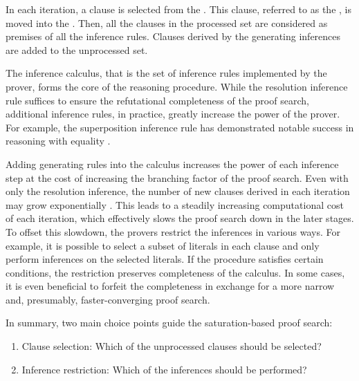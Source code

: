 In each iteration, a clause is selected from the .
This clause, referred to as the , is moved into the .
Then, all the clauses in the processed set are considered as premises of all the inference rules.
Clauses derived by the generating inferences are added to the unprocessed set.

The inference calculus, that is the set of inference rules implemented by the prover, forms the core of the reasoning procedure.
While the resolution inference rule suffices to ensure the refutational completeness of the proof search,
additional inference rules, in practice, greatly increase the power of the prover.
For example, the superposition inference rule has demonstrated notable success in reasoning with equality \cite{}.

Adding generating rules into the calculus increases the power of each inference step at the cost of increasing the branching factor of the proof search.
Even with only the resolution inference, the number of new clauses derived in each iteration may grow exponentially \cite{}.
This leads to a steadily increasing computational cost of each iteration,
which effectively slows the proof search down in the later stages.
To offset this slowdown, the provers restrict the inferences in various ways.
For example, it is possible to select a subset of literals in each clause and only perform inferences on the selected literals.
If the  procedure satisfies certain conditions,
the restriction preserves completeness of the calculus.
In some cases, it is even beneficial to forfeit the completeness in exchange for a more narrow and, presumably, faster-converging proof search.

In summary, two main choice points guide the \gls{saturation}-based proof search:
\begin{enumerate}
\item Clause selection: Which of the unprocessed clauses should be selected?
\item Inference restriction: Which of the inferences should be performed?
\end{enumerate}

